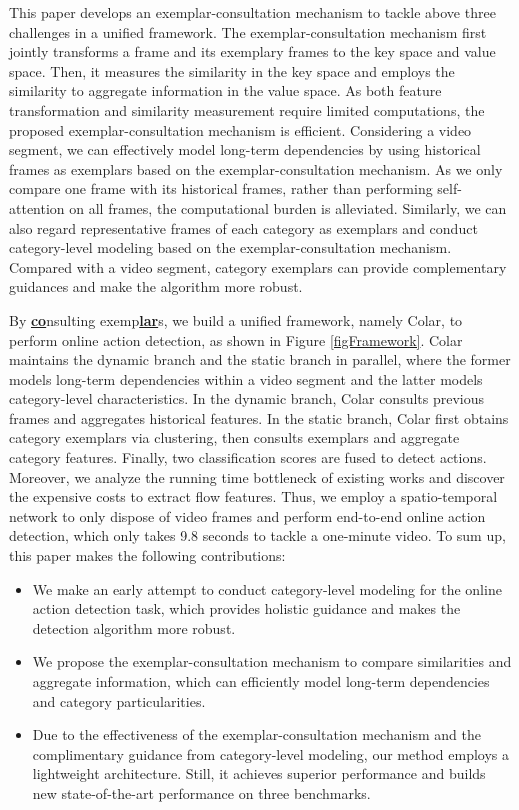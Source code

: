 \documentclass[10pt,twocolumn,letterpaper]{article}
\begin{document}
This paper develops an exemplar-consultation mechanism to tackle above three challenges in a unified framework. The exemplar-consultation mechanism first jointly transforms a frame and its exemplary frames to the key space and value space. Then, it measures the similarity in the key space and employs the similarity to aggregate information in the value space. As both feature transformation and similarity measurement require limited computations, the proposed exemplar-consultation mechanism is efficient. Considering a video segment, we can effectively model long-term dependencies by using historical frames as exemplars based on the exemplar-consultation mechanism. As we only compare one frame with its historical frames, rather than performing self-attention on all frames, the computational burden is alleviated. Similarly, we can also regard representative frames of each category as exemplars and conduct category-level modeling based on the exemplar-consultation mechanism. Compared with a video segment, category exemplars can provide complementary guidances and make the algorithm more robust.

By \underline{\textbf{co}}nsulting exemp\underline{\textbf{lar}}s, we build a unified framework, namely Colar, to perform online action detection, as shown in Figure \ref{figFramework}. Colar maintains the dynamic branch and the static branch in parallel, where the former models long-term dependencies within a video segment and the latter models category-level characteristics. In the dynamic branch, Colar consults previous frames and aggregates historical features. In the static branch, Colar first obtains category exemplars via clustering, then consults exemplars and aggregate category features. Finally, two classification scores are fused to detect actions. Moreover, we analyze the running time bottleneck of existing works and discover the expensive costs to extract flow features. Thus, we employ a spatio-temporal network to only dispose of video frames and perform end-to-end online action detection, which only takes 9.8 seconds to tackle a one-minute video. To sum up, this paper makes the following contributions:
\begin{itemize}
    \item We make an early attempt to conduct category-level modeling for the online action detection task, which provides holistic guidance and makes the detection algorithm more robust.
    \item We propose the exemplar-consultation mechanism to compare similarities and aggregate information, which can efficiently model long-term dependencies and category particularities.
    \item Due to the effectiveness of the exemplar-consultation mechanism and the complimentary guidance from category-level modeling, our method employs a lightweight architecture. Still, it achieves superior performance and builds new state-of-the-art performance on three benchmarks.
\end{itemize}
\end{document}
